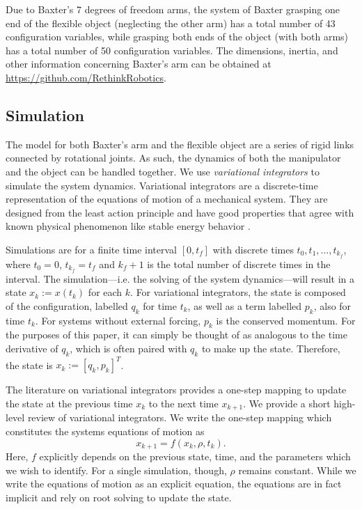 \documentclass[runningheads,a4paper]{llncs}
\begin{document}
Due to Baxter's 7 degrees of freedom arms, the system of Baxter grasping one end of the flexible object (neglecting the other arm) has a total number of 43 configuration variables, while grasping both ends of the object (with both arms) has a total number of 50 configuration variables. The dimensions, inertia, and other information concerning Baxter's arm can be obtained at \url{https://github.com/RethinkRobotics}.  

\subsection{Simulation}
The model for both Baxter's arm and the flexible object are a series of rigid links connected by rotational joints. As such, the dynamics of both the manipulator and the object can be handled together. We use \emph{variational integrators} to simulate the system dynamics.   Variational integrators are a discrete-time representation of the equations of motion of a mechanical system.  They are designed from the least action principle and have good properties that agree with known physical phenomenon like stable energy behavior \cite{pekarek_murphey}.  

Simulations are for a finite time interval $[0,t_f]$ with discrete times $t_0,t_1,\ldots,t_{k_f}$, where $t_0 = 0$, $t_{k_f} = t_f$ and $k_f+1$ is the total number of discrete times in the interval. The simulation---i.e. the solving of the system dynamics---will result in a state $x_k:=x(t_k)$ for each $k$.  For variational integrators, the state is composed of the configuration, labelled $q_k$ for time $t_k$, as well as a term labelled $p_k$, also for time $t_k$. For systems without external forcing, $p_k$ is the conserved momentum.  For the purposes of this paper, it can simply be thought of as analogous to the time derivative of $q_k$, which is often paired with $q_k$ to make up the state.  Therefore, the state is $x_k:=[q_k,p_k]^T$. 

The literature on variational integrators \cite{marsden_west} provides a one-step mapping to update the state at the previous time $x_k$ to the next time $x_{k+1}$.  We provide a short high-level review of variational integrators.  We write the one-step mapping which constitutes the systems equations of motion as 
\begin{equation}
x_{k+1} = f(x_k,\rho,t_k).
\label{eq-fk}
\end{equation}
Here, $f$ explicitly depends on the previous state, time, and the parameters which we wish to identify. For a single simulation, though, $\rho$ remains constant.  While we write the equations of motion as an explicit equation, the equations are in fact implicit and rely on root solving to update the state. 
\end{document}
